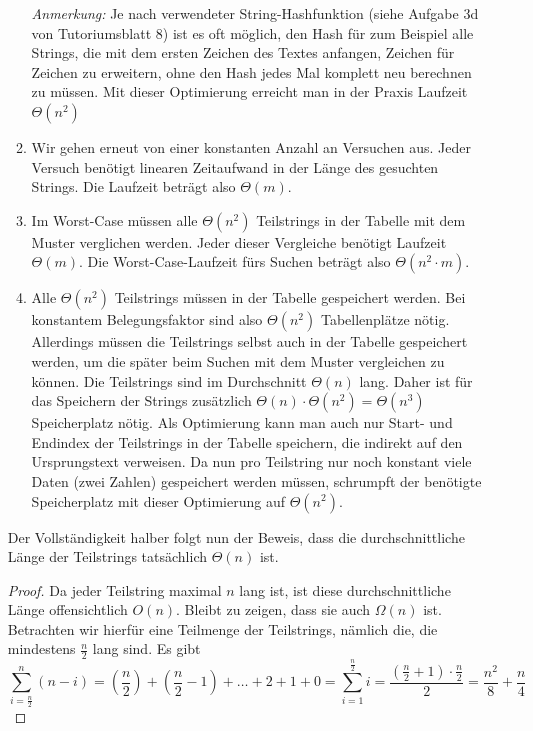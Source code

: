 \documentclass[11pt,a4paper]{article}
\begin{document}
\begin{loesung}
\begin{enumerate}
\begin{enumerate}[label=\roman*)]
            \emph{Anmerkung:} Je nach verwendeter String-Hashfunktion (siehe Aufgabe 3d von Tutoriumsblatt 8) ist es oft möglich, den Hash für zum Beispiel alle Strings, die mit dem ersten Zeichen des Textes anfangen, Zeichen für Zeichen zu erweitern, ohne den Hash jedes Mal komplett neu berechnen zu müssen.
            Mit dieser Optimierung erreicht man in der Praxis Laufzeit $\Theta(n^2)$
            \item Wir gehen erneut von einer konstanten Anzahl an Versuchen aus.
            Jeder Versuch benötigt linearen Zeitaufwand in der Länge des gesuchten Strings.
            Die Laufzeit beträgt also $\Theta(m)$.
            \item Im Worst-Case müssen alle $\Theta(n^2)$ Teilstrings in der Tabelle mit dem Muster verglichen werden.
            Jeder dieser Vergleiche benötigt Laufzeit $\Theta(m)$.
            Die Worst-Case-Laufzeit fürs Suchen beträgt also $\Theta(n^2\cdot m)$.
            \item Alle $\Theta(n^2)$ Teilstrings müssen in der Tabelle gespeichert werden.
            Bei konstantem Belegungsfaktor sind also $\Theta(n^2)$ Tabellenplätze nötig.
            Allerdings müssen die Teilstrings selbst auch in der Tabelle gespeichert werden, um die später beim Suchen mit dem Muster vergleichen zu können.
            Die Teilstrings sind im Durchschnitt $\Theta(n)$ lang.
            Daher ist für das Speichern der Strings zusätzlich $\Theta(n) \cdot \Theta(n^2) = \Theta(n^3)$ Speicherplatz nötig.
            Als Optimierung kann man auch nur Start- und Endindex der Teilstrings in der Tabelle speichern, die indirekt auf den Ursprungstext verweisen.
            Da nun pro Teilstring nur noch konstant viele Daten (zwei Zahlen) gespeichert werden müssen, schrumpft der benötigte Speicherplatz mit dieser Optimierung auf $\Theta(n^2)$.
        \end{enumerate}
        Der Vollständigkeit halber folgt nun der Beweis, dass die durchschnittliche Länge der Teilstrings tatsächlich $\Theta(n)$ ist.
        \begin{proof}
            Da jeder Teilstring maximal $n$ lang ist, ist diese durchschnittliche Länge offensichtlich $O(n)$.
            Bleibt zu zeigen, dass sie auch $\Omega(n)$ ist.
            Betrachten wir hierfür eine Teilmenge der Teilstrings, nämlich die, die mindestens $\frac{n}{2}$ lang sind.
            Es gibt 
            \begin{equation*}
                \sum\limits_{i = \frac{n}{2}}^n (n - i) = \left(\frac{n}{2}\right) + \left(\frac{n}{2} - 1\right) + \ldots + 2 + 1 + 0 = \sum\limits_{i = 1}^{\frac{n}{2}} i = \frac{\left(\frac{n}{2} + 1\right) \cdot \frac{n}{2}}{2} = \frac{n^2}{8} + \frac{n}{4} 

\end{equation*}
\end{proof}
\end{enumerate}
\end{loesung}
\end{document}
